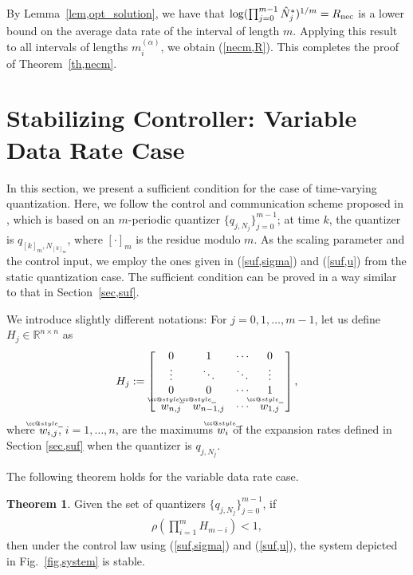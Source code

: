 \documentclass[a4paper, 11pt]{article}
\makeatletter
\def\widebar{\accentset{{\cc@style\underline{\mskip10mu}}}}
\newcommand{\R}{\mathbb{R}}
\newcommand{\Rnec}{R_{\textnormal{nec}}}
\newcommand{\hN}{\hat N}
\theoremstyle{definition}
\newtheorem{thm}{Theorem}
\newcommand{\fref}[1]{Fig.~\ref{#1}}
\makeatother
\begin{document}
By Lemma~\ref{lem,opt_solution}, we have that $\log(\prod_{j=0}^{m-1}\hN^*_j)^{1/m}=\Rnec$
is a lower bound on the average data rate of the interval of length $m$.
Applying this result to all intervals of lengths $m^{(\alpha)}_{i}$,
we obtain (\ref{necm,R}).
This completes the proof of Theorem~\ref{th,necm}.


\section{Stabilizing Controller: Variable Data Rate Case}\label{sec,averagesuf}
In this section, we present a sufficient condition for the case of time-varying
quantization.
Here, we follow the control and communication scheme proposed in \cite{Tatikonda2004},
which is based on an $m$-periodic quantizer $\{q_{j,N_j}\}_{j=0}^{m-1}$;
at time $k$, the quantizer is $q_{[k]_m,N_{[k]_m}}$, where $[\cdot]_m$
is the residue modulo $m$.
As the scaling parameter and the control input, we employ the ones
given in (\ref{suf,sigma}) and (\ref{suf,u}) from the static quantization case.
The sufficient condition can be proved in a way similar to that in Section~\ref{sec,suf}.

We introduce slightly different notations:
For $j=0,1,\dots,m-1$, let us define $H_{j}\in\R^{n\times n}$ as
\begin{gather}
 H_{j}:=
 \left[
 \begin{array}{cccc}
   0& 1& \cdots& 0\\
   \vdots& \ddots& \ddots& \vdots\\
   0& 0& \cdots& 1\\
   \widebar w_{n,j} & \widebar w_{n-1,j} & \cdots &\widebar w_{1,j}
 \end{array}
 \right],\notag
\end{gather}
where $\widebar w_{i,j}$, $i=1,\dots,n$, are
the maximums $\widebar w_i$ of the expansion rates defined in Section \ref{sec,suf}
when the quantizer is $q_{j,N_j}$.

The following theorem holds for the variable data rate case.
\begin{thm}\label{th,suf_m}
 Given the set of quantizers $\{q_{j,N_j}\}_{j=0}^{m-1}$, if
\begin{align}
 \rho(\prod_{i=1}^{m}H_{m-i})<1\label{suf_cond_m},
\end{align}
then under the control law using (\ref{suf,sigma}) and (\ref{suf,u}),
the system depicted in \fref{fig,system} is stable.
\end{thm}
\end{document}
